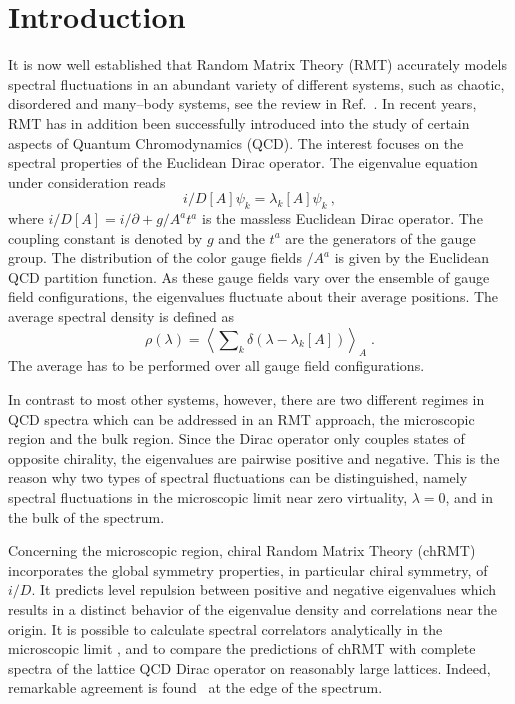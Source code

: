
\section{Introduction}
\label{sec1}
It is now well established that Random Matrix Theory (RMT) accurately
models spectral fluctuations in an abundant variety of different
systems, such as chaotic, disordered and many--body systems, see the
review in Ref.~\cite{guhr97}. In recent years, RMT has in addition
been successfully introduced into the study of certain aspects of
Quantum Chromodynamics (QCD). The interest focuses on the spectral
properties of the Euclidean Dirac operator.  The eigenvalue equation
under consideration reads
\begin{equation}
i\slash D[A]\psi_k=\lambda_k[A]\psi_k \ ,
\label{eq1}
\end{equation}
where $i\slash D[A]=i\slash\partial+g\slash A^at^a$ is the massless
Euclidean Dirac operator. The coupling constant is denoted by $g$ and
the $t^a$ are the generators of the gauge group. The distribution of
the color gauge fields $\slash A^a$ is given by the Euclidean QCD
partition function. As these gauge fields vary over the ensemble of
gauge field configurations, the eigenvalues fluctuate about their
average positions. The average spectral density is defined as
\begin{equation}
\rho(\lambda)=\left\langle\sum\nolimits_k\delta(\lambda-\lambda_k[A])
   \right\rangle_A \;.
\label{eq2}
\end{equation}
The average has to be performed over all gauge field configurations.

In contrast to most other systems, however, there are two
different regimes in QCD spectra which can be addressed in an RMT
approach, the microscopic region and the bulk region. 
Since the Dirac operator only couples states of opposite chirality,
the eigenvalues are pairwise positive and negative. This is the reason
why two types of spectral fluctuations can be distinguished, namely
spectral fluctuations in the microscopic limit near zero virtuality,
$\lambda=0$, and in the bulk of the spectrum. 
 
Concerning the microscopic region, chiral Random Matrix Theory (chRMT)
\cite{shuryak93} incorporates the global symmetry properties, in
particular chiral symmetry, of $i\slash D$. It predicts level
repulsion between positive and negative eigenvalues which results in a
distinct behavior of the eigenvalue density and correlations near the
origin.  It is possible to calculate spectral correlators analytically
in the microscopic limit \cite{verbaar93,forr93,nagao95}, and to
compare the predictions of chRMT with complete spectra of the lattice
QCD Dirac operator on reasonably large lattices.  Indeed, remarkable
agreement is found~\cite{bitsch97a,bitsch97b,ma97,verbaar96,verbaar97}
at the edge of the spectrum.

